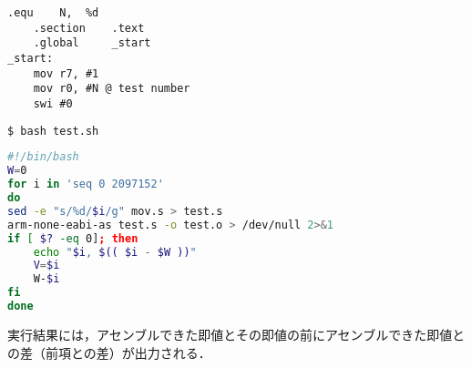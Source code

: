 \begin{center}
    \begin{minipage}[t]{0.34\textwidth}
        \centering
        \begin{lstlisting}[caption={{\ttfamily mov.s}変更後},label={src:mov2},frame={left}]
    .equ    N,  %d
    .section    .text
    .global     _start
_start:
    mov r7, #1
    mov r0, #N @ test number
    swi #0
    \end{lstlisting}
        \begin{lstlisting}[language={Bash},numbers={none},caption={実行},label={src:testexec},frame={leftline}]
$ bash test.sh          
    \end{lstlisting}
    \end{minipage}
    \hspace{2em}
    \begin{minipage}[t]{0.58\textwidth}
        \centering
        \begin{lstlisting}[language={bash},caption={{\ttfamily test.sh}},label={src:test},frame={left}]
#!/bin/bash
W=0
for i in 'seq 0 2097152'
do
sed -e "s/%d/$i/g" mov.s > test.s
arm-none-eabi-as test.s -o test.o > /dev/null 2>&1
if [ $? -eq 0]; then
    echo "$i, $(( $i - $W ))"
    V=$i
    W-$i
fi
done
    \end{lstlisting}
    \end{minipage}
\end{center}
実行結果には，アセンブルできた即値とその即値の前にアセンブルできた即値との差（前項との差）が出力される．
